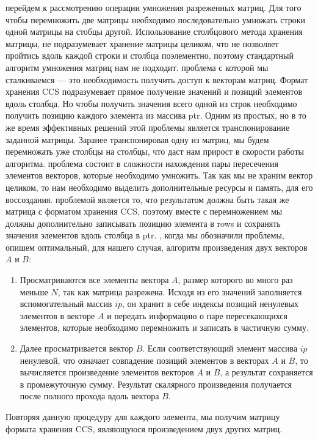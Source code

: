 \documentclass{report}
\begin{document}
 перейдем к рассмотрению операции умножения разреженных матриц. Для того чтобы перемножить две матрицы необходимо последовательно умножать строки одной матрицы на стобцы другой. Использование столбцового метода хранения матрицы, не подразумевает хранение матрицы целиком, что не позволяет пройтись вдоль каждой строки и столбца поэлементно, поэтому стандартный алгоритм умножения матриц нам не подходит.
 проблема с которой мы сталкиваемся — это необходимость получить доступ к векторам матриц. Формат хранения CCS подразумевает прямое получение значений и позиций элементов вдоль столбца. Но чтобы получить значения всего одной из строк необходимо получить позицию каждого элемента из массива ptr. Одним из простых, но в то же время эффективных решений этой проблемы является транспонирование заданной матрицы. Заранее транспонировав одну из матриц, мы будем перемножать уже столбцы на столбцы, что даст нам прирост в скорости работы алгоритма.
 проблема состоит в сложности нахождения пары пересечения элементов векторов, которые необходимо умножить. Так как мы не храним вектор целиком, то нам необходимо выделить дополнительные ресурсы и память, для его воссоздания.
 проблемой является то, что результатом должна быть такая же матрица с форматом хранения CCS, поэтому вместе с перемножением мы должны дополнительно записывать позицию элемента в rows и сохранять значения элементов вдоль столбца в ptr.
, когда мы обозначили проблемы, опишем оптимальный, для нашего случая, алгоритм произведения двух векторов $A$ и $B$:

\begin{enumerate}
    \item Просматриваются все элементы вектора $A$, размер которого во много раз меньше $N$, так как матрица разрежена. Исходя из его значений заполняется вспомогательный массив $ip$, он хранит в себе индексы позиций ненулевых элементов в векторе $A$ и передать информацию о паре пересекающихся элементов, которые необходимо перемножить и записать в частичную сумму.
    \item Далее просматривается вектор $B$. Если соответствующий элемент массива $ip$ ненулевой, что означает совпадение позиций элементов в векторах $A$ и $B$, то вычисляется произведение элементов векторов $A$ и $B$, а результат сохраняется в промежуточную сумму. Результат скалярного произведения получается после полного прохода вдоль вектора $B$.
\end{enumerate}
Повторяя данную процедуру для каждого элемента, мы получим матрицу формата хранения CCS, являющуюся произведением двух других матриц.
\newpage
\end{document}
